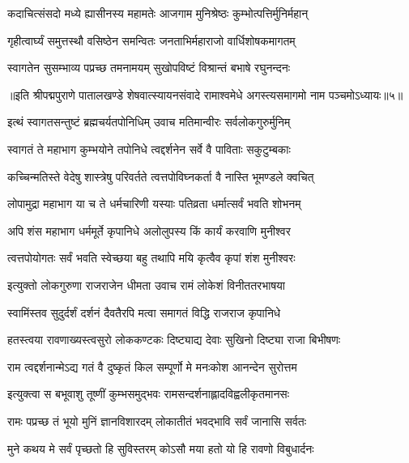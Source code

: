 \twolineshloka
{कदाचित्संसदो मध्ये ह्यासीनस्य महामतेः}
{आजगाम मुनिश्रेष्ठः कुम्भोत्पत्तिर्मुनिर्महान्}%

\twolineshloka
{गृहीत्वार्घ्यं समुत्तस्थौ वसिष्ठेन समन्वितः}
{जनताभिर्महाराजो वार्धिशोषकमागतम्}%

\twolineshloka
{स्वागतेन सुसम्भाव्य पप्रच्छ तमनामयम्}
{सुखोपविष्टं विश्रान्तं बभाषे रघुनन्दनः}%

{॥इति श्रीपद्मपुराणे पातालखण्डे शेषवात्स्यायनसंवादे रामाश्वमेधे अगस्त्यसमागमो नाम पञ्चमोऽध्यायः॥५॥}

\resetShloka


\twolineshloka
{इत्थं स्वागतसन्तुष्टं ब्रह्मचर्यतपोनिधिम्}
{उवाच मतिमान्वीरः सर्वलोकगुरुर्मुनिम्}%

\twolineshloka
{स्वागतं ते महाभाग कुम्भयोने तपोनिधे}
{त्वद्दर्शनेन सर्वे वै पाविताः सकुटुम्बकाः}%

\twolineshloka
{कच्चिन्मतिस्ते वेदेषु शास्त्रेषु परिवर्तते}
{त्वत्तपोविघ्नकर्ता वै नास्ति भूमण्डले क्वचित्}%

\twolineshloka
{लोपामुद्रा महाभाग या च ते धर्मचारिणी}
{यस्याः पतिव्रता धर्मात्सर्वं भवति शोभनम्}%

\twolineshloka
{अपि शंस महाभाग धर्ममूर्ते कृपानिधे}
{अलोलुपस्य किं कार्यं करवाणि मुनीश्वर}%

\twolineshloka
{त्वत्तपोयोगतः सर्वं भवति स्वेच्छया बहु}
{तथापि मयि कृत्वैव कृपां शंश मुनीश्वरः}%


\twolineshloka
{इत्युक्तो लोकगुरुणा राजराजेन धीमता}
{उवाच रामं लोकेशं विनीततरभाषया}%


\twolineshloka
{स्वामिंस्तव सुदुर्दर्शं दर्शनं दैवतैरपि}
{मत्वा समागतं विद्धि राजराज कृपानिधे}%

\twolineshloka
{हतस्त्वया रावणाख्यस्त्वसुरो लोककण्टकः}
{दिष्ट्याद्य देवाः सुखिनो दिष्ट्या राजा बिभीषणः}%

\twolineshloka
{राम त्वद्दर्शनान्मेऽद्य गतं वै दुष्कृतं किल}
{सम्पूर्णो मे मनःकोश आनन्देन सुरोत्तम}%

\twolineshloka
{इत्युक्त्वा स बभूवाशु तूष्णीं कुम्भसमुद्भवः}
{रामसन्दर्शनाह्लादविह्वलीकृतमानसः}%

\twolineshloka
{रामः पप्रच्छ तं भूयो मुनिं ज्ञानविशारदम्}
{लोकातीतं भवद्भावि सर्वं जानासि सर्वतः}%

\twolineshloka
{मुने कथय मे सर्वं पृच्छतो हि सुविस्तरम्}
{कोऽसौ मया हतो यो हि रावणो विबुधार्दनः}%

